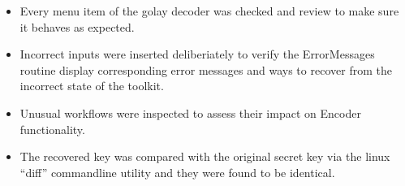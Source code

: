 \begin{itemize}
	\item Every menu item of the golay decoder was checked and review to make sure it behaves as expected.
	\item Incorrect inputs were inserted deliberiately to verify the ErrorMessages routine display corresponding error messages and ways to recover from the incorrect state of the toolkit.
	\item Unusual workflows were inspected to assess their impact on Encoder functionality.
	\item The recovered key was compared with the original secret key via the linux ``diff'' commandline utility and they were found to be identical.
\end{itemize}
